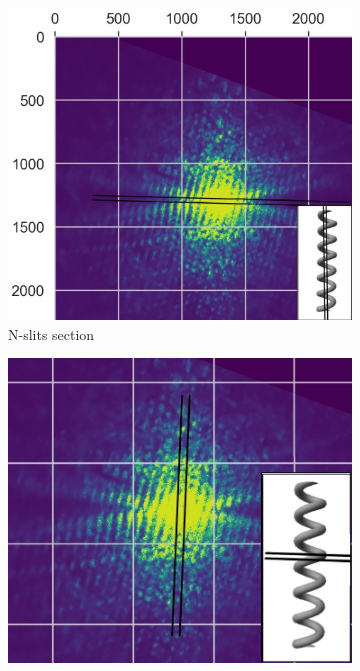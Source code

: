 \begin{figure}[H]
    \centering
    \begin{subfigure}{0.48\columnwidth}
        \centering
        \includegraphics[width=\columnwidth]{figures/HelixSection1.png} %
        \caption{N-slits section}
        \label{fig:HelixSection1}
    \end{subfigure}
    \begin{subfigure}{0.48\columnwidth}
        \centering
        \includegraphics[width=\columnwidth]{figures/HelixSection2.png}

\end{subfigure}
\end{figure}
